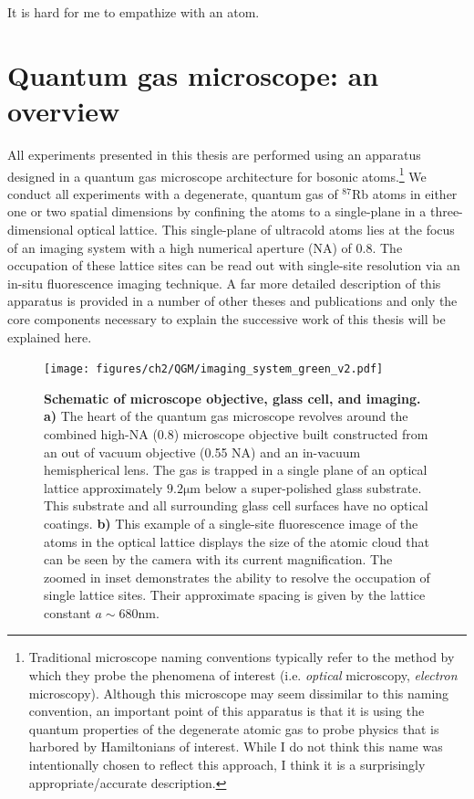 \begin{savequote}[75mm]
It is hard for me to empathize with an atom.
\end{savequote}

\chapter{Quantum gas microscope: \newline an overview}
\label{sec:qgm}

All experiments presented in this thesis are performed using an apparatus designed in a quantum gas microscope architecture for bosonic atoms.\footnote{Traditional microscope naming conventions typically refer to the method by which they probe the phenomena of interest (i.e. \emph{optical} microscopy, \emph{electron} microscopy). Although this microscope may seem dissimilar to this naming convention, an important point of this apparatus is that it is using the quantum properties of the degenerate atomic gas to probe physics that is harbored by Hamiltonians of interest. While I do not think this name was intentionally chosen to reflect this approach, I think it is a surprisingly appropriate/accurate description.} We conduct all experiments with a degenerate, quantum gas of $^{87}$Rb atoms in either one or two spatial dimensions by confining the atoms to a single-plane in a three-dimensional optical lattice. This single-plane of ultracold atoms lies at the focus of an imaging system with a high numerical aperture (NA) of 0.8. The occupation of these lattice sites can be read out with single-site resolution via an in-situ fluorescence imaging technique. A far more detailed description of this apparatus is provided in a number of other theses and publications \cite{Gillen2009, Peng2010, Bakr2011, Ma2014, Preiss2015, Zupancic2016, Tai2017Th, Lukin2018Th} and only the core components necessary to explain the successive work of this thesis will be explained here. 

\begin{figure}[t!]
		\texttt{[image: figures/ch2/QGM/imaging\_system\_green\_v2.pdf]} 
		\caption{\textbf{Schematic of microscope objective, glass cell, and imaging. a)} The heart of the quantum gas microscope revolves around the combined high-NA (0.8) microscope objective built constructed from an out of vacuum objective (0.55 NA) and an in-vacuum hemispherical lens. The gas is trapped in a single plane of an optical lattice approximately $9.2\mathrm{\mu m}$ below a super-polished glass substrate. This substrate and all surrounding glass cell surfaces have no optical coatings. \textbf{b)} This example of a single-site fluorescence image of the atoms in the optical lattice displays the size of the atomic cloud that can be seen by the camera with its current magnification. The zoomed in inset demonstrates the ability to resolve the occupation of single lattice sites. Their approximate spacing is given by the lattice constant $a\sim680 \mathrm{nm}$.}
		\label{fig:qgm}	
\end{figure}

